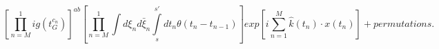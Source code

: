 \begin{equation}
\left[\prod\limits_{n=M}^1ig(t^{c_n}_G)\right]^{ab}
\left[\prod\limits_{n=M}^1\int d\xi_nd\bar{\xi}_n\int\limits_s^{s'}dt_n\theta(t_n-t_{n-1})
\right]exp\left[i\sum\limits_{n=1}^M \hat{k}(t_n)\cdot x(t_n)\right]+permutations.
\end{equation}


